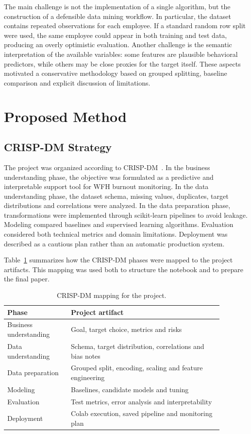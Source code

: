 \documentclass[conference]{IEEEtran}
\begin{document}
The main challenge is not the implementation of a single algorithm, but the
construction of a defensible data mining workflow. In
particular, the dataset contains repeated observations for each employee. If a
standard random row split were used, the same employee could appear in both
training and test data, producing an overly optimistic evaluation. Another
challenge is the semantic interpretation of the available variables: some
features are plausible behavioral predictors, while others may be close proxies
for the target itself. These aspects motivated a conservative methodology based
on grouped splitting, baseline comparison and explicit discussion of limitations.

\section{Proposed Method}

\subsection{CRISP-DM Strategy}

The project was organized according to CRISP-DM~\cite{shearer}. In the business
understanding phase, the objective was formulated as a predictive and
interpretable support tool for WFH burnout monitoring. In the data understanding
phase, the dataset schema, missing values, duplicates, target distributions and
correlations were analyzed. In the data preparation phase, transformations were
implemented through scikit-learn pipelines to avoid leakage. Modeling compared
baselines and supervised learning algorithms. Evaluation considered both
technical metrics and domain limitations. Deployment was described as a cautious
plan rather than an automatic production system.

Table~\ref{tab:crispdm} summarizes how the CRISP-DM phases were mapped to the
project artifacts. This mapping was used both to structure the notebook and to
prepare the final paper.

\begin{table}[h]
\centering
\caption{CRISP-DM mapping for the project.}
\label{tab:crispdm}
\begin{tabular}{p{0.26\linewidth}p{0.62\linewidth}}
\toprule
Phase & Project artifact \\
\midrule
Business understanding & Goal, target choice, metrics and risks \\
Data understanding & Schema, target distribution, correlations and bias notes \\
Data preparation & Grouped split, encoding, scaling and feature engineering \\
Modeling & Baselines, candidate models and tuning \\
Evaluation & Test metrics, error analysis and interpretability \\
Deployment & Colab execution, saved pipeline and monitoring plan \\
\bottomrule
\end{tabular}
\end{table}
\end{document}
